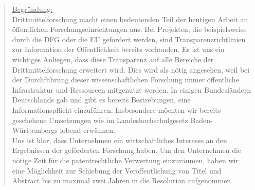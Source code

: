 \documentclass[10pt,oneside]{scrartcl}
\begin{document}
\begin{quote}
\underline{Begründung:}\\
Drittmittelforschung macht einen bedeutenden Teil der heutigen Arbeit an öffentlichen Forschungseinrichtungen aus. Bei Projekten, die beispielsweise durch die DFG oder die EU gefördert werden, sind Transparenzrichtlinien zur Information der Öffentlichkeit bereits vorhanden. Es ist uns ein wichtiges Anliegen, dass diese Transparenz auf alle Bereiche der Drittmittelforschung erweitert wird. Dies wird als nötig angesehen, weil bei der Durchführung dieser wissenschaftlichen Forschung immer öffentliche Infrastruktur und Ressourcen mitgenutzt werden. In einigen Bundesländern Deutschlands gab und gibt es bereits Bestrebungen, eine Informationspflicht einzuführen. Insbesondere möchten wir bereits geschehene Umsetzungen wie im Landeshochschulgesetz Baden-Württembergs lobend erwähnen.\\
Uns ist klar, dass Unternehmen ein wirtschaftliches Interesse an den Ergebnissen der geförderten Forschung haben. Um den Unternehmen die nötige Zeit für die patentrechtliche Verwertung einzuräumen, haben wir eine Möglichkeit zur Schiebung der Veröffentlichung von Titel und Abstract bis zu maximal zwei Jahren in die Resolution aufgenommen.

\end{quote}
\end{document}
